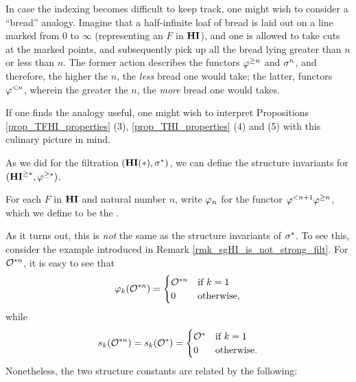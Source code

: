 \begin{rmk}
In case the indexing becomes difficult to keep track, one might
wish to consider a ``bread'' analogy. Imagine that a half-infinite 
loaf of bread is laid out on a line marked from 0 to $\infty$ 
(representing an $F$ in $\mathbf{HI}$), and one is allowed to take cuts at 
the marked points, and subsequently pick up all the bread lying 
greater than $n$ or less than $n$. The former action describes the 
functors $\varphi^{\geq n}$ and $\sigma^{n}$, and therefore, the higher the 
$n$, the \emph{less} bread one would take; the latter, functors 
$\varphi^{< n}$, wherein the greater the $n$, the \emph{more} bread one 
would takes.

If one finds the analogy useful, one might wish to interpret
Propositions \ref{prop_TFHI_properties} (3), 
\ref{prop_THI_properties} (4) and (5) with this culinary picture 
in mind.
\end{rmk}

As we did for the filtration $(\mathbf{HI}(*), \sigma^{*})$, we can define the 
structure invariants for $(\mathbf{HI}^{\geq *}, \varphi^{\geq *})$. 
\begin{defn}
For each $F$ in $\mathbf{HI}$ and natural number $n$, write $\varphi_{n}$ 
for the functor $\varphi^{< n + 1} \varphi^{\geq n}$, which we define to be the 
. 
\end{defn}

As it turns out, this is \emph{not} the same as the structure 
invariants of $\sigma^{*}$. To see this, consider the example 
introduced in Remark \ref{rmk_sgHI_is_not_strong_filt}. For $\mathcal{O}^{* n}$,
it is easy to see that 
\[
\varphi_{k}(\mathcal{O}^{* n}) = \begin{cases}
\mathcal{O}^{* n} &\textrm{if }k = 1\\
0     &\textrm{otherwise},
\end{cases}
\]
while
\[
s_k(\mathcal{O}^{* n}) = s_k(\mathcal{O}^*) = \begin{cases}
\mathcal{O}^* &\textrm{if }k = 1\\
0   &\textrm{otherwise}.
\end{cases}
\]
Nonetheless, the two structure constants are related by the 
following:

